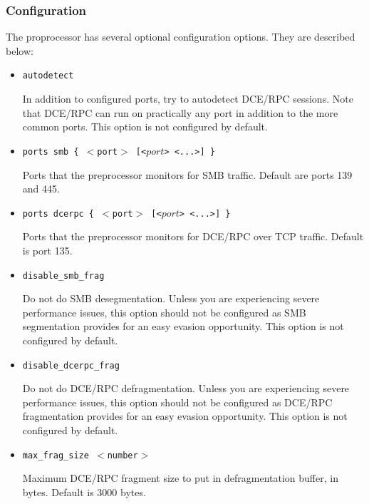 \documentclass[english]{report}
\begin{document}
\subsubsection{Configuration}

The proprocessor has several optional configuration options.  They are
described below:

\begin{itemize}

\item \texttt{autodetect}
\newline

In addition to configured ports, try to autodetect DCE/RPC sessions.  Note that
DCE/RPC can run on practically any port in addition to the more common ports.
This option is not configured by default.

\item \texttt{ports smb \{ $<$port$>$ [<$port$> <...>] \}}
\newline

Ports that the preprocessor monitors for SMB traffic.  Default are ports 139
and 445.

\item \texttt{ports dcerpc \{ $<$port$>$ [<$port$> <...>] \}}
\newline

Ports that the preprocessor monitors for DCE/RPC over TCP traffic.  Default is
port 135.

\item \texttt{disable\_smb\_frag}
\newline

Do not do SMB desegmentation.  Unless you are experiencing severe performance
issues, this option should not be configured as SMB segmentation provides for
an easy evasion opportunity.  This option is not configured by default.

\item \texttt{disable\_dcerpc\_frag}
\newline

Do not do DCE/RPC defragmentation.  Unless you are experiencing severe
performance issues, this option should not be configured as DCE/RPC
fragmentation provides for an easy evasion opportunity.  This option is not
configured by default.

\item \texttt{max\_frag\_size $<$number$>$}
\newline

Maximum DCE/RPC fragment size to put in defragmentation buffer, in bytes.
Default is 3000 bytes.


\end{itemize}
\end{document}
